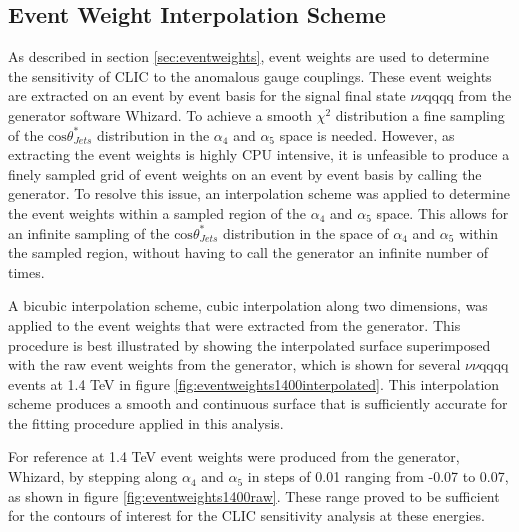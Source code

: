 \subsection{Event Weight Interpolation Scheme}
\label{sec:eventweightsinterpolation}
As described in section \ref{sec:eventweights}, event weights are used to determine the sensitivity of CLIC to the anomalous gauge couplings.  These event weights are extracted on an event by event basis for the signal final state $\nu\nu\text{qqqq}$ from the generator software Whizard.  To achieve a smooth $\chi^{2}$ distribution a fine sampling of the $\text{cos}\theta^{*}_{Jets}$ distribution in the $\alpha_{4}$ and $\alpha_{5}$ space is needed.  However, as extracting the event weights is highly CPU intensive, it is unfeasible to produce a finely sampled grid of event weights on an event by event basis by calling the generator.  To resolve this issue, an interpolation scheme was applied to determine the event weights within a sampled region of the $\alpha_{4}$ and $\alpha_{5}$ space.  This allows for an infinite sampling of the $\text{cos}\theta^{*}_{Jets}$ distribution in the space of $\alpha_{4}$ and $\alpha_{5}$ within the sampled region, without having to call the generator an infinite number of times.

A bicubic interpolation scheme, cubic interpolation along two dimensions, was applied to the event weights that were extracted from the generator.  This procedure is best illustrated by showing the interpolated surface superimposed with the raw event weights from the generator, which is shown for several $\nu\nu\text{qqqq}$ events at 1.4 TeV in figure \ref{fig:eventweights1400interpolated}.  This interpolation scheme produces a smooth and continuous surface that is sufficiently accurate for the fitting procedure applied in this analysis.  

For reference at 1.4 TeV event weights were produced from the generator, Whizard, by stepping along $\alpha_{4}$ and $\alpha_{5}$ in steps of 0.01 ranging from -0.07 to 0.07, as shown in figure \ref{fig:eventweights1400raw}.  These range proved to be sufficient for the contours of interest for the CLIC sensitivity analysis at these energies.

